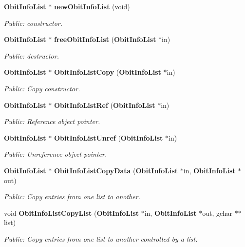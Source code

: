 \begin{CompactItemize}
\item 
{\bf Obit\-Info\-List} $\ast$ {\bf new\-Obit\-Info\-List} (void)
\begin{CompactList}\small\item\em Public: constructor. \item\end{CompactList}\item 
{\bf Obit\-Info\-List} $\ast$ {\bf free\-Obit\-Info\-List} ({\bf Obit\-Info\-List} $\ast$in)
\begin{CompactList}\small\item\em Public: destructor. \item\end{CompactList}\item 
{\bf Obit\-Info\-List} $\ast$ {\bf Obit\-Info\-List\-Copy} ({\bf Obit\-Info\-List} $\ast$in)
\begin{CompactList}\small\item\em Public: Copy constructor. \item\end{CompactList}\item 
{\bf Obit\-Info\-List} $\ast$ {\bf Obit\-Info\-List\-Ref} ({\bf Obit\-Info\-List} $\ast$in)
\begin{CompactList}\small\item\em Public: Reference object pointer. \item\end{CompactList}\item 
{\bf Obit\-Info\-List} $\ast$ {\bf Obit\-Info\-List\-Unref} ({\bf Obit\-Info\-List} $\ast$in)
\begin{CompactList}\small\item\em Public: Unreference object pointer. \item\end{CompactList}\item 
{\bf Obit\-Info\-List} $\ast$ {\bf Obit\-Info\-List\-Copy\-Data} ({\bf Obit\-Info\-List} $\ast$in, {\bf Obit\-Info\-List} $\ast$out)
\begin{CompactList}\small\item\em Public: Copy entries from one list to another. \item\end{CompactList}\item 
void {\bf Obit\-Info\-List\-Copy\-List} ({\bf Obit\-Info\-List} $\ast$in, {\bf Obit\-Info\-List} $\ast$out, gchar $\ast$$\ast$list)
\begin{CompactList}\small\item\em Public: Copy entries from one list to another controlled by a list. \item\end{CompactList}\item 
$$
\end{CompactItemize}
